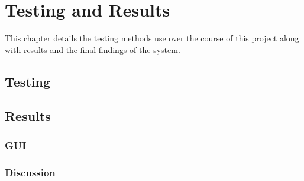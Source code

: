 \chapter{Testing and Results}
\label{cha:results}
This chapter details the testing methods use over the course of this project along with results and the final findings of the system.

\section{Testing}
\section{Results}
\subsection{GUI}
\subsection{Discussion}